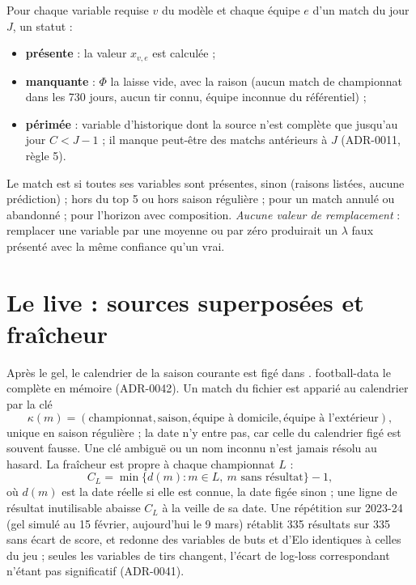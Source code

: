 Pour chaque variable requise \(v\) du modèle et chaque équipe \(e\) d'un match du jour \(J\), un statut :

\begin{itemize}
  \item \textbf{présente} : la valeur \(x_{v,e}\) est calculée ;
  \item \textbf{manquante} : \(\Phi\) la laisse vide, avec la raison (aucun match de championnat dans les
        730 jours, aucun tir connu, équipe inconnue du référentiel) ;
  \item \textbf{périmée} : variable d'historique dont la source n'est complète que jusqu'au jour
        \(C < J - 1\) ; il manque peut-être des matchs antérieurs à \(J\) (ADR-0011, règle 5).
\end{itemize}

Le match est  si toutes ses variables sont présentes,  sinon (raisons
listées, aucune prédiction) ;  hors du top 5 ou hors saison régulière ;
 pour un match annulé ou abandonné ;  pour l'horizon avec
composition. \emph{Aucune valeur de remplacement} : remplacer une variable par une moyenne ou par
zéro produirait un \(\lambda\) faux présenté avec la même confiance qu'un vrai.

\section{Le live : sources superposées et fraîcheur}
\label{sec:inference-live}

Après le gel, le calendrier de la saison courante est figé dans . football-data le
complète en mémoire (ADR-0042). Un match du fichier est apparié au calendrier par la clé
\[
  \kappa(m) = (\text{championnat}, \text{saison}, \text{équipe à domicile}, \text{équipe à l'extérieur}),
\]
unique en saison régulière ; la date n'y entre pas, car celle du calendrier figé est souvent fausse.
Une clé ambiguë ou un nom inconnu n'est jamais résolu au hasard. La fraîcheur est propre à chaque
championnat \(L\) :
\[
  C_L = \min\{ d(m) : m \in L,\ m \text{ sans résultat} \} - 1 ,
\]
où \(d(m)\) est la date réelle si elle est connue, la date figée sinon ; une ligne de résultat
inutilisable abaisse \(C_L\) à la veille de sa date. Une répétition sur 2023-24 (gel simulé au
15 février, \og aujourd'hui \fg{} le 9 mars) rétablit 335 résultats sur 335 sans écart de score, et
redonne des variables de buts et d'Elo identiques à celles du jeu ; seules les variables de tirs
changent, l'écart de log-loss correspondant n'étant pas significatif (ADR-0041).

